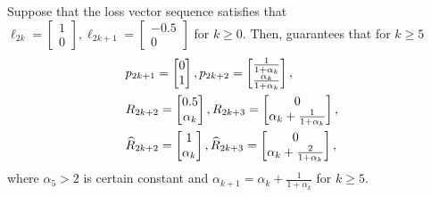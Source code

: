 \begin{lemma}\label{lem: PRM+}
   Suppose that the loss vector sequence satisfies that $\ell_{2k}=\begin{bmatrix}
    1\\ 0
\end{bmatrix},{\ell}_{2k+1}=\begin{bmatrix}
    -0.5\\ 0
\end{bmatrix}$ for $k\geq 0$. Then, \PRM guarantees that for $k\geq 5$
\begin{align*}
&{p}_{2k+1}=\begin{bmatrix}
    0\\ 1
\end{bmatrix},{p}_{2k+2}=\begin{bmatrix}
    \frac{1}{1+\alpha_k}\\ \frac{\alpha_k}{1+\alpha_k}
\end{bmatrix},\\
&{R}_{2k+2}=\begin{bmatrix}
    0.5\\ \alpha_k
\end{bmatrix},R_{2k+3}=\begin{bmatrix}
    0\\ \alpha_k+\frac{1}{1+\alpha_k}
\end{bmatrix},\\
&\widehat{R}_{2k+2}=\begin{bmatrix}
    1\\ \alpha_k
\end{bmatrix},\widehat{R}_{2k+3}=\begin{bmatrix}
    0\\ \alpha_k+\frac{2}{1+\alpha_k}
\end{bmatrix},
\end{align*}
where $\alpha_5>2$ is certain constant and $\alpha_{k+1}=\alpha_k+\frac{1}{1+\alpha_k}$ for $k\geq 5$.
\end{lemma}

